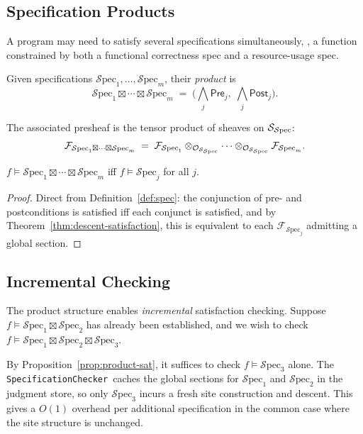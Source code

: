 \documentclass[11pt]{article}
\newcommand{\Spec}{\mathcal{S}\mathrm{pec}}        %
\newcommand{\Pre}{\ensuremath{\mathsf{Pre}}}                     %
\newcommand{\Post}{\ensuremath{\mathsf{Post}}}                   %
\newcommand{\JudProd}{\boxtimes}                    %
\newcommand{\SatSite}{{\Site_{\Spec}}}                %
\newcommand{\SpecificationChecker}{\texttt{SpecificationChecker}}
\begin{document}
\subsection{Specification Products}\label{sec:spec-products}

A program may need to satisfy several specifications simultaneously,
\eg, a function constrained by both a functional correctness spec and
a resource-usage spec.

\begin{definition}\label{def:spec-product}
Given specifications $\Spec_1, \ldots, \Spec_m$, their \emph{product}
is
\[
  \Spec_1 \JudProd \cdots \JudProd \Spec_m
  \;=\; \bigl(\bigwedge_j \Pre_j,\; \bigwedge_j \Post_j\bigr).
\]
\end{definition}

The associated presheaf is the tensor product of sheaves on $\SatSite$:
\[
  \mathcal{F}_{\Spec_1 \JudProd \cdots \JudProd \Spec_m}
  \;=\;
  \mathcal{F}_{\Spec_1} \otimes_{\mathcal{O}_\SatSite} \cdots
  \otimes_{\mathcal{O}_\SatSite} \mathcal{F}_{\Spec_m}.
\]

\begin{proposition}\label{prop:product-sat}
$f \models \Spec_1 \JudProd \cdots \JudProd \Spec_m$
iff $f \models \Spec_j$ for all $j$.
\end{proposition}
\begin{proof}
Direct from Definition~\ref{def:spec}: the conjunction of pre- and
postconditions is satisfied iff each conjunct is satisfied, and by
Theorem~\ref{thm:descent-satisfaction}, this is equivalent to each
$\mathcal{F}_{\Spec_j}$ admitting a global section.
\end{proof}

\subsection{Incremental Checking}\label{sec:incremental}

The product structure enables \emph{incremental} satisfaction checking.
Suppose $f \models \Spec_1 \JudProd \Spec_2$ has already been
established, and we wish to check $f \models \Spec_1 \JudProd \Spec_2
\JudProd \Spec_3$.

By Proposition~\ref{prop:product-sat}, it suffices to check
$f \models \Spec_3$ alone.  The \SpecificationChecker\ caches the
global sections for $\Spec_1$ and $\Spec_2$ in the judgment store, so
only $\Spec_3$ incurs a fresh site construction and descent.
This gives a $O(1)$ overhead per additional specification in the common
case where the site structure is unchanged.
\end{document}
